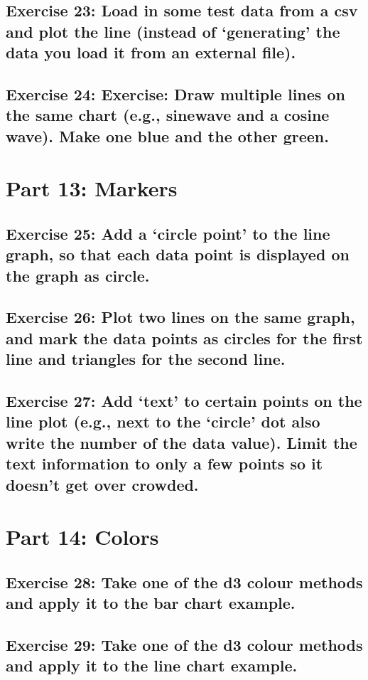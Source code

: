 \documentclass[11pt]{article}   	%
\begin{document}
\subsection{Exercise 23: Load in some test data from a csv and plot the line (instead of ‘generating’ the data you load it from an external file).}
\subsection{ Exercise 24: Exercise: Draw multiple lines on the same chart (e.g., sinewave and a cosine wave). Make one blue and the other green.}

\section{Part 13: Markers}
\subsection{Exercise 25: Add a ‘circle point’ to the line graph, so that each data point is displayed on the graph as circle.}
\subsection{ Exercise 26: Plot two lines on the same graph, and mark the data points as circles for the first line and triangles for the second line.}
\subsection{Exercise 27: Add ‘text’ to certain points on the line plot (e.g., next to the ‘circle’ dot also write the number of the data value). Limit the text information to only a few points so it doesn’t get over crowded.}

\section{Part 14: Colors}
\subsection{ Exercise 28: Take one of the d3 colour methods and apply it to the bar chart example. }
\subsection{Exercise 29: Take one of the d3 colour methods and apply it to the line chart example. }
\end{document}
